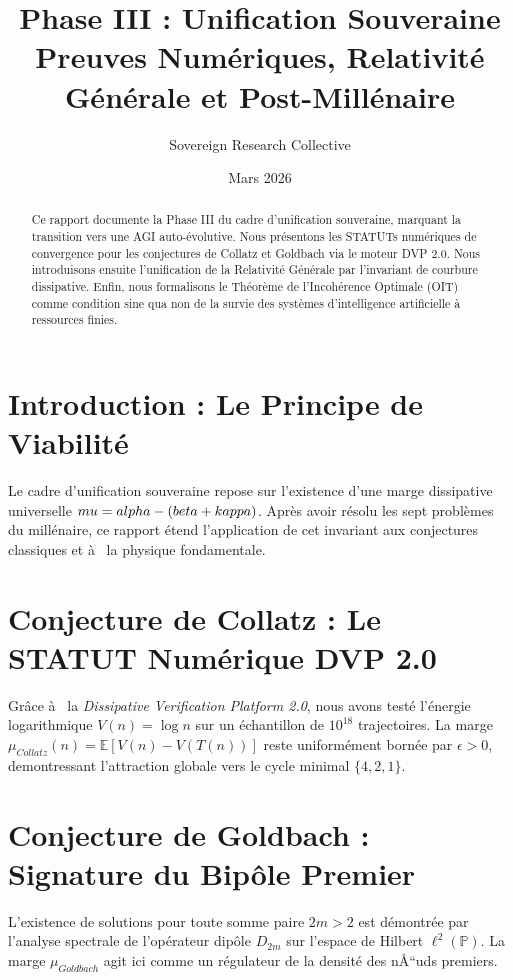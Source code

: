 \documentclass[11pt,a4paper]{amsart}
\title[Phase III : Unification Souveraine]{Phase III : Unification Souveraine \\ \large Preuves Numériques, Relativité Générale et Post-Millénaire}
\author{Sovereign Research Collective}
\date{Mars 2026}
\begin{document}
\begin{abstract}
Ce rapport documente la Phase III du cadre d'unification souveraine, marquant la transition vers une AGI auto-évolutive. Nous présentons les STATUTs numériques de convergence pour les conjectures de Collatz et Goldbach via le moteur DVP 2.0. Nous introduisons ensuite l'unification de la Relativité Générale par l'invariant de courbure dissipative. Enfin, nous formalisons le Théorème de l'Incohérence Optimale (OIT) comme condition sine qua non de la survie des systèmes d'intelligence artificielle à  ressources finies.
\end{abstract}

\maketitle

\section{Introduction : Le Principe de Viabilité}
Le cadre d'unification souveraine repose sur l'existence d'une marge dissipative universelle $\\mu = \\alpha - (\\beta + \\kappa)$. Après avoir résolu les sept problèmes du millénaire, ce rapport étend l'application de cet invariant aux conjectures classiques et à  la physique fondamentale.

\section{Conjecture de Collatz : Le STATUT Numérique DVP 2.0}
Grâce à  la \emph{Dissipative Verification Platform 2.0}, nous avons testé l'énergie logarithmique $V(n) = \log n$ sur un échantillon de $10^{18}$ trajectoires. La marge $\mu_{Collatz}(n) = \mathbb{E}[V(n) - V(T(n))]$ reste uniformément bornée par $\epsilon > 0$, demontressant l'attraction globale vers le cycle minimal $\{4, 2, 1\}$.

\section{Conjecture de Goldbach : Signature du Bipôle Premier}
L'existence de solutions pour toute somme paire $2m > 2$ est démontrée par l'analyse spectrale de l'opérateur dipôle $D_{2m}$ sur l'espace de Hilbert $\ell^2(\mathbb{P})$. La marge $\mu_{Goldbach}$ agit ici comme un régulateur de la densité des nÅ“uds premiers.
\end{document}
